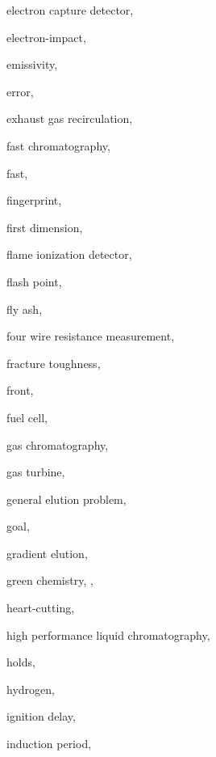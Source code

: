 \begin{theindex}
  \item \lowercase {electron capture detector}, 
  \item \lowercase {electron-impact}, 
  \item \lowercase {emissivity}, 
  \item \lowercase {error}, 
  \item \lowercase {exhaust gas recirculation}, 
  \item \lowercase {fast chromatography}, 
  \item \lowercase {fast}, 
  \item \lowercase {fingerprint}, 
  \item \lowercase {first dimension}, 
  \item \lowercase {flame ionization detector}, 
  \item \lowercase {flash point}, 
  \item \lowercase {fly ash}, 
  \item \lowercase {four wire resistance measurement}, 
  \item \lowercase {fracture toughness}, 
  \item \lowercase {front}, 
  \item \lowercase {fuel cell}, 
  \item \lowercase {gas chromatography}, 
  \item \lowercase {gas turbine}, 
  \item \lowercase {general elution problem}, 
  \item \lowercase {goal}, 
  \item \lowercase {gradient elution}, 
  \item \lowercase {green chemistry}, , 
  \item \lowercase {heart-cutting}, 
  \item \lowercase {high performance liquid chromatography}, 
  \item \lowercase {holds}, 
  \item \lowercase {hydrogen}, 
  \item \lowercase {ignition delay}, 
  \item \lowercase {induction period}, 

\end{theindex}

